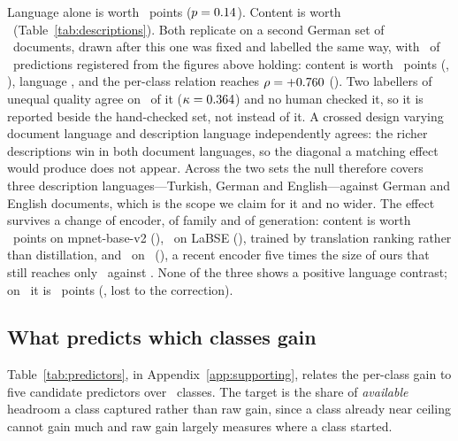 \documentclass[11pt]{article}
\begin{document}
Language alone is worth \LanguageEffect~points ($p = 0.14$). Content is
worth \ContentEffect\ (Table~\ref{tab:descriptions}). Both replicate on a second German set of
\ExtendedN\ documents, drawn after this one was fixed and labelled the same
way, with \ExtendedHeld\ of \ExtendedPredictions\ predictions registered from
the figures above holding: content is worth \ExtendedContentGain~points
(\ExtendedContentPStat, \HolmExtendedContentStat), language
\ExtendedLanguageGain, and the per-class relation reaches
$\rho = +0.760$ (\HolmExtendedRhoStat). Two labellers of unequal quality
agree on \ExtendedAgreement\ of it ($\kappa = 0.364$) and no human
checked it, so it is reported beside the hand-checked set, not instead of it. A crossed design varying document language and description
language independently agrees: the richer descriptions win in both document
languages, so the diagonal a matching effect would produce does not appear.
Across the two sets the null therefore covers three description
languages---Turkish, German and English---against German and English
documents, which is the scope we claim for it and no wider. The
effect survives a change of encoder, of family and of generation: content is
worth \MpnetContentEffect~points on mpnet-base-v2 (\MpnetContentPStat),
\LabseContentEffect\ on LaBSE (\LabseContentPStat), trained by translation
ranking rather than distillation, and \BgeContentEffect\ on \BgeModel\
(\BgeContentPStat), a recent encoder five times the size of ours that still
reaches only \BgeTopOne\ against \OursTopOne. None of the three shows a
positive language contrast; on \BgeModel\ it is
\BgeLanguageEffect~points (\BgeLanguagePStat, lost to the correction).

\subsection{What predicts which classes gain}
\label{sec:predictors}

Table~\ref{tab:predictors}, in Appendix~\ref{app:supporting}, relates the per-class gain to five candidate
predictors over \NCLASSES\ classes. The target is the share of \emph{available}
headroom a class captured rather than raw gain, since a class already near
ceiling cannot gain much and raw gain largely measures where a class started.
\end{document}
